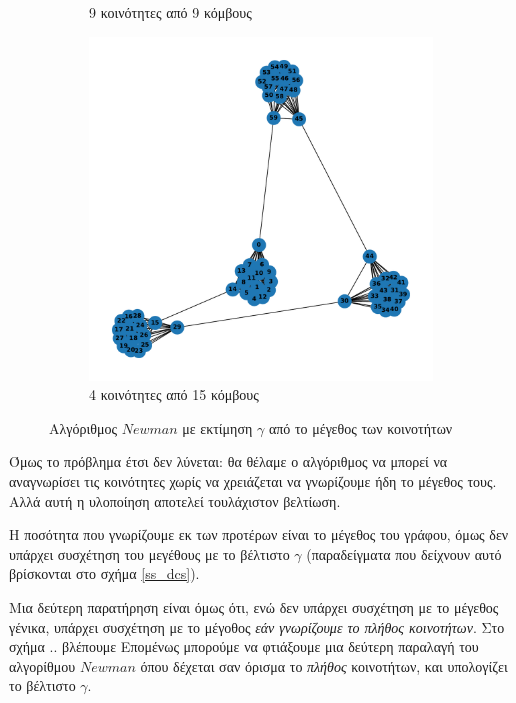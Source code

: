 \documentclass[12pt, letterpaper]{article}
\begin{document}
\begin{figure}[h]
\begin{subfigure}{0.3\textwidth}
      \caption{9 κοινότητες από 9 κόμβους}
      \label{9b}
  \end{subfigure}
  \begin{subfigure}{0.3\textwidth}
      \includegraphics[width=\textwidth]{cluster_4,15newman_auto.pdf}
      \caption{4 κοινότητες από 15 κόμβους}
      \label{9c}
  \end{subfigure}
  \caption{Αλγόριθμος $Newman$ με εκτίμηση $\gamma$ από το μέγεθος των κοινοτήτων}
  \label{auto_cluster_size}
\end{figure}







Όμως το πρόβλημα έτσι δεν λύνεται: θα θέλαμε ο αλγόριθμος να μπορεί να αναγνωρίσει 
τις κοινότητες χωρίς να χρειάζεται να γνωρίζουμε ήδη το μέγεθος τους. Αλλά αυτή η υλοποίηση 
αποτελεί τουλάχιστον βελτίωση.



Η ποσότητα που γνωρίζουμε εκ των προτέρων είναι το μέγεθος του γράφου, όμως δεν υπάρχει
συσχέτηση του μεγέθους με το βέλτιστο $\gamma$ (παραδείγματα που δείχνουν αυτό βρίσκονται 
στο σχήμα \ref{ss_dcs}).



Μια δεύτερη παρατήρηση είναι όμως ότι, ενώ δεν υπάρχει συσχέτηση με το μέγεθος γένικα,
υπάρχει συσχέτηση με το μέγοθος \emph{εάν γνωρίζουμε το πλήθος κοινοτήτων}.
Στο σχήμα .. βλέπουμε 
Επομένως 
μπορούμε να φτιάξουμε μια δεύτερη παραλαγή του αλγορίθμου $Newman$ όπου δέχεται σαν 
όρισμα το \emph{πλήθος} κοινοτήτων, και υπολογίζει το βέλτιστο $\gamma$. 
\end{document}
